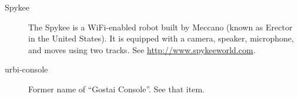 \begin{description}
\item[Spykee] The Spykee is a WiFi-enabled robot built by Meccano (known as
  Erector in the United States). It is equipped with a camera, speaker,
  microphone, and moves using two tracks. See
  \url{http://www.spykeeworld.com}.

\item[urbi-console] Former name of ``Gostai Console''.  See that item.
\end{description}

